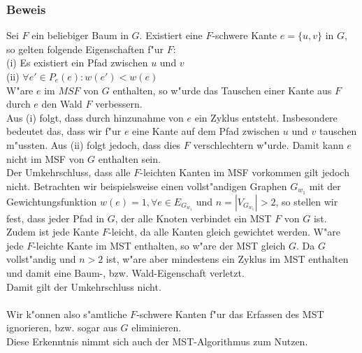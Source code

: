 \subsubsection{Beweis}
\label{sec:fProof}

Sei $F$ ein beliebiger Baum in $G$.
    Existiert eine $F$-schwere Kante $e=\{u, v\}$ in $G$, so gelten folgende 
    Eigenschaften f"ur $F$:\\
(i) Es existiert ein Pfad zwischen $u$ und $v$\\
(ii) $\forall e' \in P_e(e) : w(e') < w(e)$\\
W"are $e$ im $MSF$ von $G$ enthalten, so w"urde das Tauschen einer Kante aus
    $F$ durch $e$ den Wald $F$ verbessern.\\
Aus (i) folgt, dass durch hinzunahme von $e$ ein Zyklus entsteht. 
    Insbesondere bedeutet das, 
    dass wir f"ur $e$ eine Kante auf dem Pfad zwischen $u$ und $v$ tauschen
    m"ussten.
    Aus (ii) folgt jedoch, dass dies $F$ verschlechtern w"urde.
    Damit kann $e$ nicht im MSF von $G$ enthalten sein.\\
Der Umkehrschluss, dass alle $F$-leichten Kanten im MSF vorkommen gilt jedoch
    nicht.
    Betrachten wir beispielsweise einen vollst"andigen Graphen $G_{w_1}$ mit der 
    Gewichtungsfunktion $w(e) = 1, \forall e \in E_{G_{w_1}}$ und 
    $n = |V_{G_{w_1}}| > 2$, so stellen wir fest, dass jeder Pfad in $G$, der alle
    Knoten verbindet ein MST $F$ von $G$ ist.
    Zudem ist jede Kante $F$-leicht, da alle Kanten gleich gewichtet werden.
    W"are jede $F$-leichte Kante im MST enthalten, so w"are der MST gleich $G$.
    Da $G$ vollst"andig und $n > 2$ ist, w"are aber mindestens ein Zyklus im 
    MST enthalten und damit eine Baum-, bzw. Wald-Eigenschaft verletzt.\\
    Damit gilt der Umkehrschluss nicht.\\
\\
Wir k"onnen also s"amtliche $F$-schwere Kanten f"ur das Erfassen des MST 
    ignorieren, bzw. sogar aus $G$ eliminieren.\\
Diese Erkenntnis nimmt sich auch der MST-Algorithmus zum Nutzen.\\

